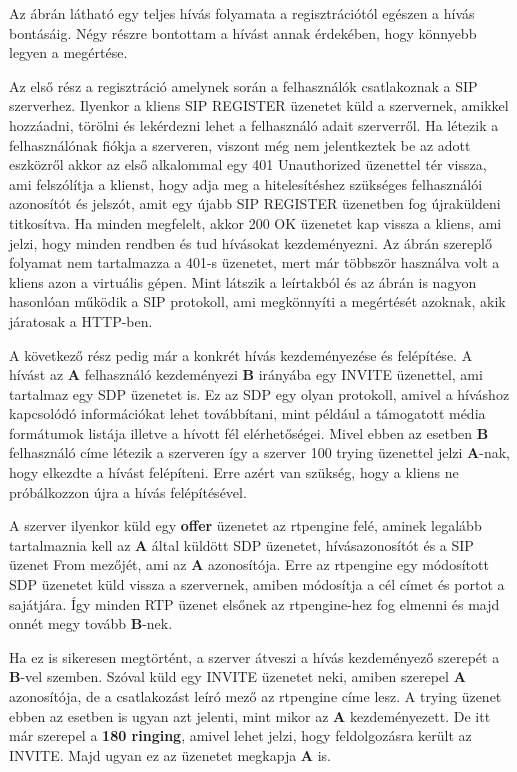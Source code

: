 Az ábrán látható egy teljes hívás folyamata a regisztrációtól egészen a hívás bontásáig.
Négy részre bontottam a hívást annak érdekében, hogy könnyebb legyen a megértése.

Az első rész a regisztráció amelynek során a felhasználók csatlakoznak a SIP szerverhez.
Ilyenkor a kliens SIP REGISTER üzenetet küld a szervernek, amikkel hozzáadni, törölni és
lekérdezni lehet a felhasználó adait szerverről. Ha létezik a felhasználónak fiókja 
a szerveren, viszont még nem jelentkeztek be az adott eszközről akkor az első alkalommal 
egy 401 Unauthorized üzenettel tér vissza, ami felszólítja a klienst, hogy adja meg a 
hitelesítéshez szükséges felhasználói azonosítót és jelszót, amit egy újabb SIP REGISTER
üzenetben fog újraküldeni titkosítva. Ha minden megfelelt, akkor 200 OK üzenetet kap 
vissza a kliens, ami jelzi, hogy minden rendben és tud hívásokat kezdeményezni. Az ábrán
szereplő folyamat nem tartalmazza a 401-s üzenetet, mert már többször használva volt a 
kliens azon a virtuális gépen. Mint látszik a leírtakból és az ábrán is nagyon hasonlóan
működik a SIP protokoll, ami megkönnyíti a megértését azoknak, akik járatosak a HTTP-ben. 

A következő rész pedig már a konkrét hívás kezdeményezése és felépítése. A hívást az 
\textbf{A} felhasználó kezdeményezi \textbf{B} irányába egy INVITE üzenettel, ami tartalmaz
egy SDP üzenetet is. Ez az SDP egy olyan protokoll, amivel a híváshoz kapcsolódó információkat
lehet továbbítani, mint például a támogatott média formátumok listája illetve a hívott fél
elérhetőségei. Mivel ebben az esetben \textbf{B} felhasználó címe létezik a szerveren így
a szerver 100 trying üzenettel jelzi \textbf{A}-nak, hogy elkezdte a hívást felépíteni. Erre
azért van szükség, hogy a kliens ne próbálkozzon újra a hívás felépítésével.

A szerver ilyenkor küld egy \textbf{offer} üzenetet az rtpengine felé, aminek legalább 
tartalmaznia kell az \textbf{A} által küldött SDP üzenetet, hívásazonosítót és a SIP üzenet
From mezőjét, ami az \textbf{A} azonosítója. Erre az rtpengine egy módosított SDP üzenetet küld
vissza a szervernek, amiben módosítja a cél címet és portot a sajátjára. Így minden RTP
üzenet elsőnek az rtpengine-hez fog elmenni és majd onnét megy tovább \textbf{B}-nek.

Ha ez is sikeresen megtörtént, a szerver átveszi a hívás kezdeményező szerepét a \textbf{B}-vel
szemben. Szóval küld egy INVITE üzenetet neki, amiben szerepel \textbf{A} azonosítója, de
a csatlakozást leíró mező az rtpengine címe lesz. A trying üzenet ebben az esetben is 
ugyan azt jelenti, mint mikor az \textbf{A} kezdeményezett. De itt már szerepel a 
\textbf{180 ringing}, amivel lehet jelzi, hogy feldolgozásra került az INVITE. Majd ugyan ez 
az üzenetet megkapja \textbf{A} is. 

